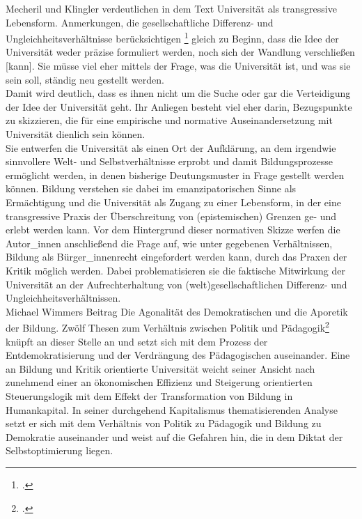 Mecheril und Klingler verdeutlichen in dem Text \glqq Universität als
transgressive Lebensform. Anmerkungen, die gesellschaftliche Differenz- und
Ungleichheitsverhältnisse berücksichtigen\grqq\footnotemark
\footcitetext{metcheril} gleich zu Beginn, dass \glqq die Idee
der Universität weder präzise formuliert werden, noch sich der Wandlung
verschließen [kann].\grqq\footnotemark {} Sie müsse viel eher mittels der Frage, was die
Universität ist, und was sie sein soll, ständig neu gestellt werden.\\
Damit wird deutlich, dass es ihnen nicht um die Suche oder gar die Verteidigung der
Idee der Universität geht. Ihr Anliegen besteht viel eher darin, Bezugspunkte
zu skizzieren, die für eine empirische und normative Auseinandersetzung mit
Universität dienlich sein können.\\
Sie entwerfen die Universität als
einen Ort der Aufklärung, an dem \glqq irgendwie sinnvollere Welt- und
Selbstverhältnisse\grqq\footnotemark {} erprobt und damit Bildungsprozesse ermöglicht werden, in denen bisherige Deutungsmuster in Frage gestellt werden können. Bildung
verstehen sie dabei im emanzipatorischen Sinne als Ermächtigung und die
Universität als Zugang zu einer Lebensform, in der eine transgressive Praxis
der Überschreitung von (epistemischen) Grenzen ge- und erlebt werden kann. Vor
dem Hintergrund dieser normativen Skizze werfen die Autor\_innen anschließend
die Frage auf, wie unter gegebenen Verhältnissen, Bildung als Bürger\_innenrecht
eingefordert werden kann, durch das Praxen der Kritik möglich werden. Dabei
problematisieren sie die faktische Mitwirkung der Universität an der
Aufrechterhaltung von (welt)gesellschaftlichen Differenz- und
Ungleichheitsverhältnissen.\\

Michael Wimmers Beitrag \glqq Die Agonalität des
Demokratischen und die Aporetik der Bildung. Zwölf Thesen zum Verhältnis
zwischen Politik und Pädagogik\grqq\footnotemark \footcitetext{wimmer} knüpft
an dieser Stelle an und setzt sich mit dem Prozess der Entdemokratisierung und
der Verdrängung des Pädagogischen\footnotemark {} auseinander. Eine an Bildung und Kritik
orientierte Universität weicht seiner Ansicht nach zunehmend \glqq einer an
ökonomischen Effizienz und Steigerung orientierten Steuerungslogik\grqq\footnotemark {} mit dem
Effekt der Transformation von Bildung in Humankapital. In seiner durchgehend
Kapitalismus thematisierenden Analyse setzt er sich mit dem Verhältnis von
Politik zu Pädagogik und Bildung zu Demokratie auseinander und weist auf die
Gefahren hin, die in dem Diktat der Selbstoptimierung liegen.\\


